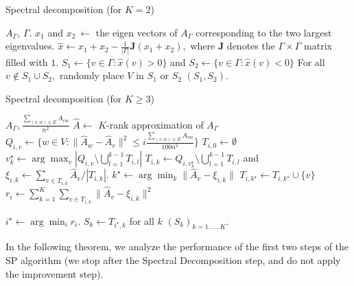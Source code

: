 \begin{algorithm}[t!]
   \caption{Spectral decomposition (for $K=2$)}
   \label{alg:trimspec}
\begin{algorithmic}
 $A_{\Gamma}$, $\Gamma$.
\STATE $x_1$ and $x_2 ~ \leftarrow$ the eigen vectors of $A_{\Gamma}$ corresponding to the two largest eigenvalues.
\ENDIF
\STATE $\hat{x} \leftarrow x_1 + x_2 -\frac{1}{| \Gamma |} {\bm J}(x_1 +
  x_2),$ where $\bm{J}$ denotes the $\Gamma \times \Gamma$ matrix
  filled with $1.$
\STATE $S_1 \leftarrow \{v \in \Gamma : \hat{x}(v) >0 \}$ and $S_2 \leftarrow \{v \in \Gamma : \hat{x}(v) <0 \}$
\STATE For all $v \notin S_1 \cup S_2,$ randomly place $V$ in
$S_1$ or $S_2$
 $(S_1 , S_2)$.
\end{algorithmic}
\end{algorithm}

\begin{algorithm}[t!]
   \caption{Spectral decomposition (for $K\ge 3$)}
   \label{alg:specg}
\begin{algorithmic}
    $A_{\Gamma}, \frac{ \sum_{(v,w) \in E } A_{vw} }{n^2}$ 
\STATE $\hat{A} \leftarrow $ $K$-rank approximation of $A_{\Gamma}$
\STATE $Q_{i,v} \leftarrow \{ w \in {V} :
\| \hat{A}_w  -\hat{A}_v\|^2 \le i \frac{\sum_{(v,w) \in E } A_{vw} }{100n^2} \} $
\STATE $T_{i,0}\leftarrow \emptyset$
\STATE $v_k^{\star} \leftarrow \arg \max_{v} | Q_{i,v}\setminus \bigcup_{l=1}^{k-1} T_{i,l} |$ 
\STATE $T_{i,k} \leftarrow Q_{i,v_k^{\star}} \setminus \bigcup_{l=1}^{k-1} T_{i,l} $ and $\xi_{i,k} \leftarrow \sum_{v \in T_{i,k}}  \hat{A}_v/ |T_{i,k}| .$
\ENDFOR
{}
\STATE $k^{\star} \leftarrow \arg \min_{k} \| \hat{A}_v -\xi_{i,k}\|$ 
\STATE $T_{i,k^{\star}} \leftarrow T_{i,k^{\star}} \cup \{v\}$
\ENDFOR
\STATE $r_i  \leftarrow \sum_{k=1}^K \sum_{v \in T_{i,k}} \| \hat{A}_v -\xi_{i,k}\|^2$
\ENDFOR

\STATE $i^{\star} \leftarrow \arg \min_{i} r_i.$
\STATE $S_k\leftarrow T_{i^\star,k}$ for all $k$
 $(S_k)_{k=1,\ldots,K}$.
\end{algorithmic}
\end{algorithm}

In the following theorem, we analyze the performance of the first two steps of the SP algorithm (we stop after the Spectral Decomposition step, and do not apply the improvement step). 

